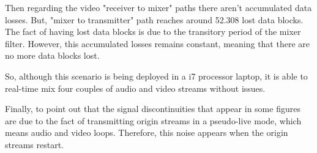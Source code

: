 Then regarding the video "receiver to mixer" paths there aren't accumulated data losses. But, "mixer to transmitter" path reaches around 52.308 lost data blocks. The fact of having lost data blocks is due to the transitory period of the mixer filter. However, this accumulated losses remains constant, meaning that there are no more data blocks lost.

So, although this scenario is being deployed in a i7 processor laptop, it is able to real-time mix four couples of audio and video streams without issues.

Finally, to point out that the signal discontinuities that appear in some figures are due to the fact of transmitting origin streams in a pseudo-live mode, which means audio and video loops. Therefore, this noise appears when the origin streams restart.